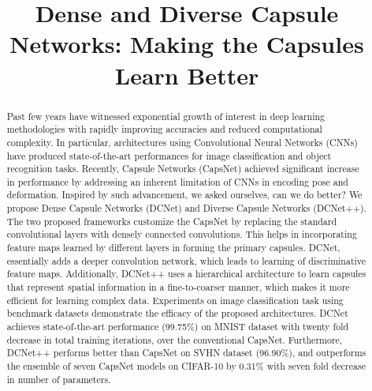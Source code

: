 \documentclass{bmvc2k}
\title{Dense and Diverse Capsule Networks: Making the Capsules Learn Better}
\begin{document}
\maketitle

\begin{abstract}
Past few years have witnessed exponential growth of interest in deep learning methodologies with rapidly improving accuracies and reduced computational complexity. In particular, architectures using Convolutional Neural Networks (CNNs) have produced state-of-the-art performances for image classification and object recognition tasks. Recently, Capsule Networks (CapsNet) achieved significant increase in performance by addressing an inherent limitation of CNNs in encoding pose and deformation. Inspired by such advancement, we asked ourselves, can we do better?  We propose Dense Capsule Networks (DCNet) and Diverse Capsule Networks (DCNet++). The two proposed frameworks customize the CapsNet by replacing the standard convolutional layers with densely connected convolutions. This helps in incorporating feature maps learned by different layers in forming the primary capsules. DCNet, essentially adds a deeper convolution network, which leads to learning of discriminative feature maps. Additionally, DCNet++ uses a hierarchical architecture to learn capsules that represent spatial information in a fine-to-coarser manner, which makes it more efficient for learning complex data. Experiments on image classification task using benchmark datasets demonstrate the efficacy of the proposed architectures. DCNet achieves state-of-the-art performance (99.75\%) on MNIST dataset with twenty fold decrease in total training iterations, over the conventional CapsNet. Furthermore, DCNet++ performs better than CapsNet on SVHN dataset (96.90\%), and outperforms the ensemble of seven CapsNet models on CIFAR-10 by 0.31\% with seven fold decrease in number of parameters.


\end{abstract}
\end{document}
